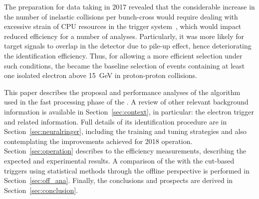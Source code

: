 The preparation for data taking in 2017 revealed that the considerable increase in the number of inelastic collisions per bunch-cross would require dealing with excessive strain of CPU resources in the trigger system~\cite{ATL-DAQ-PUB-2018-002}, which would impact reduced efficiency for a number of analyses. Particularly, it was more likely for target  signals to overlap in the detector due to pile-up effect, hence deteriorating the identification efficiency. Thus, for allowing a more efficient selection under such conditions, the \rnn{} became the baseline selection of events containing at least one isolated electron above \SI{15}{\GeV} in proton-proton collisions.

This paper describes the proposal and performance analyses of the \rnn{}
algorithm used in the fast processing phase of the \hlt{}. A review
of other relevant background information is available in
Section~\ref{sec:context}, in particular: the electron
trigger and related information. Full details of its identification procedure are
in Section~\ref{sec:neuralringer}, including the training and tuning strategies and also contemplating the improvements achieved for 2018 operation. Section~\ref{sec:operation} describes to the efficiency measurements, describing the expected and experimental results. A comparison of the \rnn with
the cut-based triggers using statistical methods through the offline perspective
is performed in Section~\ref{sec:off_ana}. Finally, the conclusions and prospects 
are derived in Section~\ref{sec:conclusion}.





